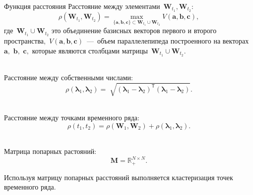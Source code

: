 \documentclass[9pt,pdf,hyperref={unicode}]{beamer}
\begin{document}
\begin{frame}[shrink=5]{Функция расстояния}
\justifying
Расстояние между элементами~$\mathbf{W}_{t_1},\mathbf{W}_{t_2}$:\\
$$
\rho\left(\textbf{W}_{t_1}, \textbf{W}_{t_2}\right) = \max_{\{\textbf{a},\textbf{b},\textbf{c}\} \subset \textbf{W}_{t_1}\cup \textbf{W}_{t_2} } V\left(\textbf{a},\textbf{b},\textbf{c}\right), 
$$
где~$\textbf{W}_{t_1}\cup\textbf{W}_{t_2}$ это объединение базисных векторов первого и второго пространства,~$V\left(\textbf{a},\textbf{b},\textbf{c}\right)$~---~объем параллелепипеда построенного на векторах~$\textbf{a},$ $\textbf{b},$ $\textbf{c},$ которые являются столбцами матрицы~$\textbf{W}_{t_1}\cup\textbf{W}_{t_2}$.

~\\
Расстояние между собственными числами:\\
$$
\rho\left(\bm{\lambda}_1, \bm{\lambda}_2\right) = \sqrt[]{\left(\bm{\lambda}_1 - \bm{\lambda}_2\right)^{\mathsf{T}}\left(\bm{\lambda}_1 - \bm{\lambda}_2\right)}.
$$

~\\
Расстояние между точками временного ряда:\\
$$
\rho\left(t_1, t_2\right) = \rho\left(\textbf{W}_1, \textbf{W}_2\right) + \rho\left(\bm{\lambda}_1, \bm{\lambda}_2\right).
$$

~\\
Матрица попарных растояний:\\
$$\textbf{M} = \mathbb{R}_{+}^{N\times N}.$$

Используя матрицу попарных расстояний выполняется кластеризация точек временного ряда.
\end{frame}
\end{document}
